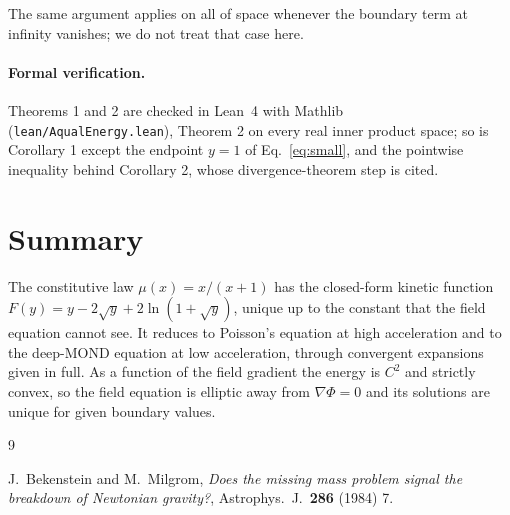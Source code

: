 \documentclass[twocolumn]{iopjournal}
\begin{document}
\medskip
\noindent
The same argument applies on all of space whenever the boundary
term at infinity vanishes; we do not treat that case here.

\paragraph{Formal verification.} Theorems 1 and 2 are checked in
Lean~4 with Mathlib (\texttt{lean/AqualEnergy.lean}), Theorem 2 on every
real inner product space; so is Corollary 1 except the endpoint $y = 1$
of Eq.~\eqref{eq:small}, and the pointwise inequality behind
Corollary 2, whose divergence-theorem step is cited.


\section*{Summary}

The constitutive law $\mu(x) = x/(x+1)$ has the closed-form kinetic
function $F(y) = y - 2\sqrt y + 2\ln(1 + \sqrt y)$, unique up to the
constant that the field equation cannot see. It reduces to
Poisson's equation at high acceleration and to the deep-MOND
equation at low acceleration, through convergent expansions given in
full. As a function of the field gradient the energy is $C^2$ and
strictly convex, so the field equation is elliptic away from
$\nabla\Phi = 0$ and its solutions are unique for given boundary
values.


\begin{thebibliography}{9}

J.~Bekenstein and M.~Milgrom,
\textit{Does the missing mass problem signal the breakdown of
Newtonian gravity?},
Astrophys.\ J.\ \textbf{286} (1984) 7.

\end{thebibliography}
\end{document}
